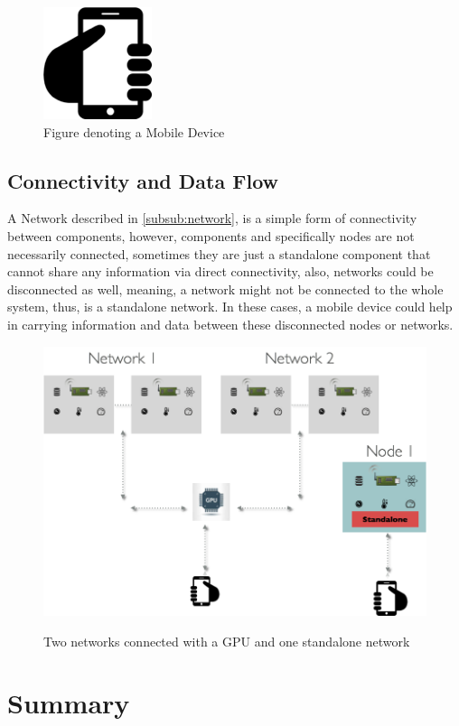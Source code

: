 \begin{figure}[H]
	\centering
	\includegraphics[scale=0.3]{images/mobile.png}
	\caption{Figure denoting a Mobile Device}
	\label{fig:mobile}
\end{figure}



\subsection{Connectivity and Data Flow}
A Network described in \ref{subsub:network}, is a simple form of connectivity between components, however, components and specifically nodes are not necessarily connected, sometimes they are just a standalone component that cannot share any information via direct connectivity, also, networks could be disconnected as well, meaning, a network might not be connected to the whole system, thus, is a standalone network. In these cases, a mobile device could help in carrying information and data between these disconnected nodes or networks. 

\begin{figure}[H]
	\centering
	\includegraphics[scale=0.5]{images/system.png}
	\label{fig:system}
	\caption{Two networks connected with a GPU and one standalone network}
\end{figure}









\section{Summary}



